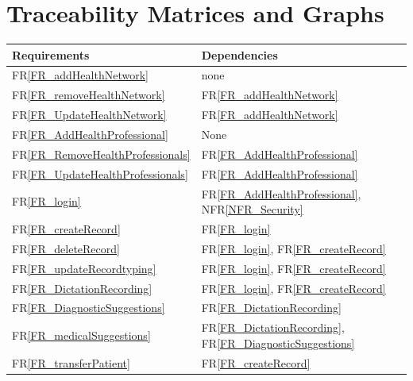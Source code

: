 \documentclass[12pt]{article}
\begin{document}
\section{Traceability Matrices and Graphs}
\begin{tabularx}{\textwidth}{p{3cm}p{2cm}X} 

  \toprule {\bf Requirements} & {\bf Dependencies}\\ 

  \midrule 

  FR\ref{FR_addHealthNetwork} &   none  \\   

  FR\ref{FR_removeHealthNetwork} &  FR\ref{FR_addHealthNetwork}\\   

  FR\ref{FR_UpdateHealthNetwork} &  FR\ref{FR_addHealthNetwork} \\  

  FR\ref{FR_AddHealthProfessional} &  None  \\   

  FR\ref{FR_RemoveHealthProfessionals} &  FR\ref{FR_AddHealthProfessional} \\  

  FR\ref{FR_UpdateHealthProfessionals} &  FR\ref{FR_AddHealthProfessional} \\  

  FR\ref{FR_login} &  FR\ref{FR_AddHealthProfessional}, NFR\ref{NFR_Security}  \\     

  FR\ref{FR_createRecord} & FR\ref{FR_login} \\  

  FR\ref{FR_deleteRecord} & FR\ref{FR_login}, FR\ref{FR_createRecord} \\  

  FR\ref{FR_updateRecordtyping} & FR\ref{FR_login}, FR\ref{FR_createRecord} \\     

  FR\ref{FR_DictationRecording} & FR\ref{FR_login}, FR\ref{FR_createRecord} \\  

  FR\ref{FR_DiagnosticSuggestions} &  FR\ref{FR_DictationRecording} \\       

  FR\ref{FR_medicalSuggestions} & FR\ref{FR_DictationRecording}, FR\ref{FR_DiagnosticSuggestions}  \\  

  FR\ref{FR_transferPatient} &  FR\ref{FR_createRecord}\\  


\end{tabularx}
\end{document}
